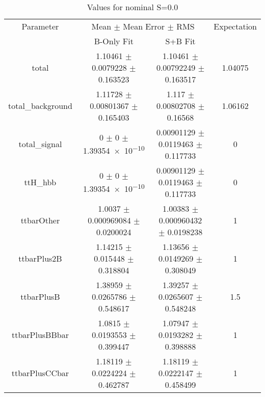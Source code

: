 \begin{table}
\centering
\caption{Values for nominal S=0.0}
\begin{tabular}{cccc}
\toprule
Parameter & \multicolumn{2}{c}{Mean $\pm$ Mean Error $\pm$ RMS} & Expectation\\
 & B-Only Fit & S+B Fit & \\
\midrule
total & \num{1.10461} $\pm$ \num{0.0079228} $\pm$ \num{0.163523} & \num{1.10461} $\pm$ \num{0.00792249} $\pm$ \num{0.163517} & \num{1.04075}\\
total\_background & \num{1.11728} $\pm$ \num{0.00801367} $\pm$ \num{0.165403} & \num{1.117} $\pm$ \num{0.00802708} $\pm$ \num{0.16568} & \num{1.06162}\\
total\_signal & \num{0} $\pm$ \num{0} $\pm$ \num{1.39354e-10} & \num{0.00901129} $\pm$ \num{0.0119463} $\pm$ \num{0.117733} & \num{0}\\
ttH\_hbb & \num{0} $\pm$ \num{0} $\pm$ \num{1.39354e-10} & \num{0.00901129} $\pm$ \num{0.0119463} $\pm$ \num{0.117733} & \num{0}\\
ttbarOther & \num{1.0037} $\pm$ \num{0.000969084} $\pm$ \num{0.0200024} & \num{1.00383} $\pm$ \num{0.000960432} $\pm$ \num{0.0198238} & \num{1}\\
ttbarPlus2B & \num{1.14215} $\pm$ \num{0.015448} $\pm$ \num{0.318804} & \num{1.13656} $\pm$ \num{0.0149269} $\pm$ \num{0.308049} & \num{1}\\
ttbarPlusB & \num{1.38959} $\pm$ \num{0.0265786} $\pm$ \num{0.548617} & \num{1.39257} $\pm$ \num{0.0265607} $\pm$ \num{0.548248} & \num{1.5}\\
ttbarPlusBBbar & \num{1.0815} $\pm$ \num{0.0193553} $\pm$ \num{0.399447} & \num{1.07947} $\pm$ \num{0.0193282} $\pm$ \num{0.398888} & \num{1}\\
ttbarPlusCCbar & \num{1.18119} $\pm$ \num{0.0224224} $\pm$ \num{0.462787} & \num{1.18119} $\pm$ \num{0.0222147} $\pm$ \num{0.458499} & \num{1}\\
\bottomrule
\end{tabular}
\end{table}